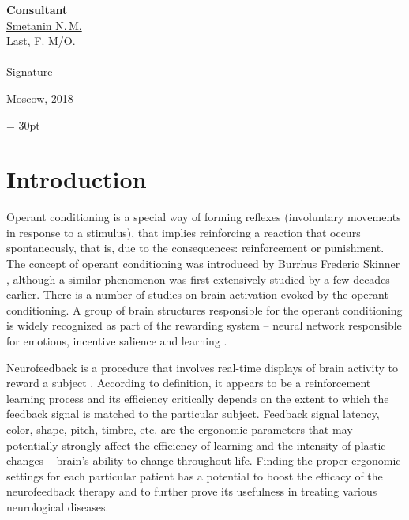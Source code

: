\documentclass[14pt,a4paper]{scrartcl}
\begin{document}
\begin{titlepage}
	\hfill\begin{minipage}{0.4\textwidth}
		\textbf{Consultant}\\[0.3cm]
		\underline{Smetanin N.\,M.} \\
		\scriptsize{Last, F. M/O.}\\\\
		\underline{\hspace{7cm}}
		\scriptsize{Signature}\\
			\end{minipage}

	    \vfill
	    \vfill
	    \vfill  

		\begin{center}
		\vfill
		  Moscow, 2018
		\end{center}
	\end{titlepage}


\newpage
\tableofcontents
\fancyhf{} 
\renewcommand{\headrulewidth}{0pt} 
\footskip = 30pt
\fancyfoot[R]{\thepage} 
\pagestyle{fancy}
\fancypagestyle{plain}{
  \fancyhf{}
  \renewcommand{\headrulewidth}{0pt}
  \fancyhf[lef,rof]{\thepage}
}




\newpage
\section{Introduction}
\label{sec:Introduction}

Operant conditioning is a special way of forming reflexes (involuntary movements in response to a stimulus), that implies reinforcing a reaction that occurs spontaneously, that is, due to the consequences: reinforcement or punishment. The concept of operant conditioning was introduced by Burrhus Frederic Skinner \cite{Skinner1971a,Skinner1971,Skinner1950,Jones1939}, although a similar phenomenon was first extensively studied by \cite{Thorndike1898} a few decades earlier. There is a number of studies on brain activation evoked by the operant conditioning. A group of brain structures responsible for the operant conditioning is widely recognized as part of the rewarding system – neural network responsible for emotions, incentive salience and learning \cite{Schultz2015}. 

Neurofeedback is a procedure that involves real-time displays of brain activity to reward a subject \cite{Kamiya2011}. According to definition, it appears to be a reinforcement learning process and its efficiency critically depends on the extent to which the feedback signal is matched to the particular subject. Feedback signal latency, color, shape, pitch, timbre, etc. are the ergonomic parameters that may potentially strongly affect the efficiency of learning and the intensity of plastic changes – brain’s ability to change throughout life. Finding the proper ergonomic settings for each particular patient has a potential to boost the efficacy of the neurofeedback therapy and to further prove its usefulness in treating various neurological diseases.
\newpage
\end{document}
